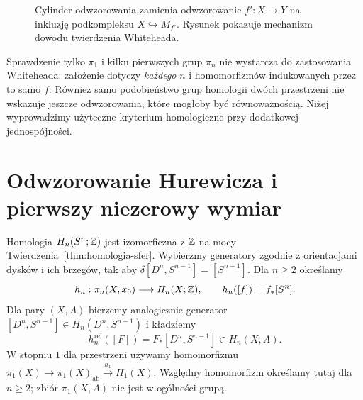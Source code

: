 \begin{figure}[H]
\centering
{}
\caption{Cylinder odwzorowania zamienia
odwzorowanie $f':X\to Y$ na inkluzję
podkompleksu $X\hookrightarrow M_{f'}$.
Rysunek pokazuje mechanizm dowodu
twierdzenia Whiteheada.}
\label{fig:cylinder-whiteheada}
\end{figure}

\begin{uwaga}
Sprawdzenie tylko $\pi_1$ i kilku pierwszych grup $\pi_n$
nie wystarcza do zastosowania Whiteheada: założenie dotyczy
\emph{każdego} $n$ i homomorfizmów indukowanych przez to samo $f$.
Również samo podobieństwo grup homologii dwóch przestrzeni
nie wskazuje jeszcze odwzorowania, które mogłoby być równoważnością.
Niżej wyprowadzimy użyteczne kryterium homologiczne
przy dodatkowej jednospójności.
\end{uwaga}

\section{Odwzorowanie Hurewicza i pierwszy niezerowy wymiar}
\label{sec:hurewicz-wyzszy}

\begin{definicja}
\label{def:mapa-hurewicza}
Homologia $H_n(S^n;\mathbb{Z})$
jest izomorficzna z $\mathbb{Z}$
na mocy
Twierdzenia~\ref{thm:homologia-sfer}.
Wybierzmy generatory zgodnie z orientacjami dysków i ich brzegów,
tak aby $\delta[D^n,S^{n-1}]=[S^{n-1}]$.
Dla $n\geq2$ określamy
\[
 h_n:\pi_n(X,x_0)\longrightarrow H_n(X;\mathbb{Z}),
 \qquad h_n([f])=f_*[S^n].
\]
Dla pary $(X,A)$ bierzemy
analogicznie generator
$[D^n,S^{n-1}]
\in H_n(D^n,S^{n-1})$ i
kładziemy
\[
 h_n^{\mathrm{rel}}([F])
 =F_*[D^n,S^{n-1}]
 \in H_n(X,A).
\]
W stopniu $1$ dla przestrzeni używamy homomorfizmu
$\pi_1(X)\to\pi_1(X)_{\mathrm{ab}}\xrightarrow{h_1}H_1(X)$.
Względny homomorfizm określamy tutaj dla $n\geq2$;
zbiór $\pi_1(X,A)$ nie jest w ogólności grupą.
\end{definicja}

